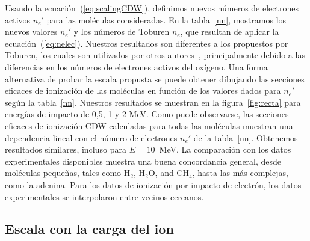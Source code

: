 Usando la ecuación~(\ref{eq:scalingCDW}), definimos nuevos números de 
electrones activos $n_e'$ para las moléculas consideradas. En la 
tabla~\ref{nn}, mostramos los nuevos valores $n_e'$ y los números de 
Toburen $n_e$, que resultan de aplicar la ecuación~(\ref{eq:nelec}). 
Nuestros resultados son diferentes a los propuestos por Toburen, los 
cuales son utilizados por otros autores~\cite{itoh2013}, principalmente 
debido a las diferencias en los números de electrones activos del 
oxígeno. Una forma alternativa de probar la escala propusta se puede
obtener dibujando las secciones eficaces de ionización de las moléculas 
en función de los valores dados para $n_e'$ según la tabla~\ref{nn}. 
Nuestros resultados se muestran en la figura~\ref{fig:recta} para 
energías de impacto de 0,5, 1 y 2 MeV. Como puede observarse, las 
secciones eficaces de ionización CDW calculadas para todas las moléculas 
muestran una dependencia lineal con el número de electrones $n_e'$ de 
la tabla~\ref{nn}. Obtenemos resultados similares, incluso para 
$E=10$~MeV. La comparación con los datos experimentales disponibles 
muestra una buena concordancia general, desde moléculas pequeñas, tales
como H$_2$, H$_2$O, and CH$_4$, hasta las más complejas, como la adenina. 
Para los datos de ionización por impacto de electrón, los datos 
experimentales se interpolaron entre vecinos cercanos. 


\subsection{Escala con la carga del ion}
\label{sec:zscaling}


